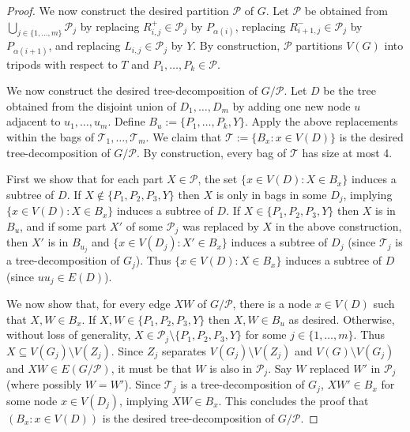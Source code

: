 \documentclass{patmorin}
\newcommand{\PP}{\mathcal{P}}
\begin{document}
\begin{proof}

We now construct the desired partition $\PP$ of $G$.
Let $\PP$ be obtained from $\bigcup_{j\in\{1,\dots,m\}} \PP_j$ by
replacing $R_{i,j}^+\in\PP_j$ by $P_{\alpha(i)}$,
replacing $R_{i+1,j}^-\in\PP_j$ by $P_{\alpha(i+1)}$, and
replacing $L_{i,j}\in\PP_j$ by $Y$.
By construction, $\PP$ partitions $V(G)$ into tripods with respect to $T$ and $P_1,\ldots,P_k\in \PP$.

We now construct the desired tree-decomposition of $G/\PP$. Let $D$ be the tree obtained from the disjoint union of $D_1,\dots,D_m$ by adding one new node $u$ adjacent to $u_1,\dots,u_m$. Define $B_u:=\{P_1,\dots,P_k,Y\}$. Apply the above replacements within the bags of $\mathcal{T}_1,\dots,\mathcal{T}_m$. We claim that $\mathcal{T}:=\{B_x:x\in V(D)\}$ is the desired tree-decomposition of $G/\PP$. By construction, every bag of $\mathcal{T}$ has size at most 4.

First we show that for each part $X\in\PP$, the set $\{x\in V(D) : X\in B_x\}$ induces a subtree of $D$. If $X\not\in \{P_1,P_2,P_3,Y\}$ then $X$ is only in bags in some $D_j$, implying $\{x\in V(D) : X\in B_x\}$ induces a subtree of $D$. If $X\in \{P_1,P_2,P_3,Y\}$ then $X$ is in $B_u$, and if some part $X'$ of some $\PP_j$ was replaced by $X$ in the above construction, then $X'$ is in $B_{u_j}$ and $\{x\in V(D_j):X'\in B_x\}$ induces a subtree of $D_j$ (since $\mathcal{T}_j$ is a tree-decomposition of $G_j$). Thus $\{x\in V(D) : X\in B_x\}$ induces a subtree of $D$ (since $uu_j\in E(D)$).

We now show that, for every edge $XW$ of $G/\PP$, there is a node $x\in V(D)$ such that $X,W\in B_x$. If $X,W\in \{P_1,P_2,P_3,Y\}$ then $X,W\in B_u$ as desired. Otherwise, without loss of generality, $X\in \PP_j\setminus \{P_1,P_2,P_3,Y\}$ for some $j\in\{1,\dots,m\}$.
Thus $X\subseteq V(G_j)\setminus V(Z_j)$. Since $Z_j$ separates $V(G_j)\setminus V(Z_j)$ and $V(G)\setminus V(G_j)$ and $XW\in E(G/\PP)$, it must be that $W$ is also in $\PP_j$. Say $W$ replaced $W'$ in $\PP_j$ (where possibly $W=W'$). Since $\mathcal{T}_j$ is a tree-decomposition of $G_j$, $XW'\in B_x$ for some node $x\in V(D_j)$, implying $XW\in B_x$. This concludes the proof that $(B_x:x\in V(D))$ is the desired tree-decomposition of $G/\PP$.


\end{proof}
\end{document}
